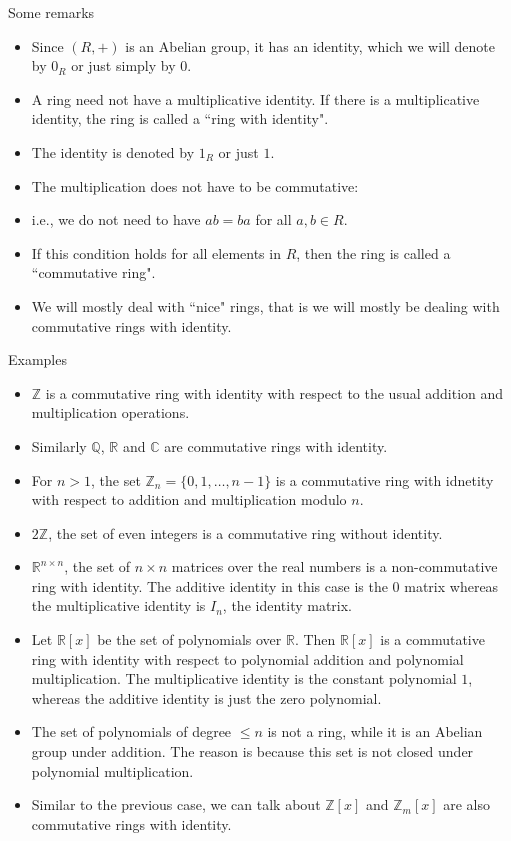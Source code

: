 \documentclass[ %
 10pt, xcolor={dvipsnames,svgnames,x11names,hyperref},
   hyperref={colorlinks=true,citecolor=green,linkcolor=DarkRed,urlcolor=ProcessBlue,anchorcolor=blue}
  ]{beamer}
\newenvironment{stepitemize}{\begin{itemize}[<+->]}{\end{itemize} }
\newcommand{\Z}{\mathbb{Z}}
\newcommand{\Q}{\mathbb{Q}}
\newcommand{\R}{\mathbb{R}}
\newcommand{\C}{\mathbb{C}}
\begin{document}
\begin{frame}{Some remarks}
    \begin{stepitemize}
    \item Since $(R,+)$ is an Abelian group, it has an identity, which we will denote by $0_R$ or just simply by $0$. 
    \item A ring need not have a multiplicative identity. If there is a multiplicative identity, the ring is called a ``ring with identity". 
    \item The identity is denoted by $1_R$ or just $1$.
    \item The multiplication does not have to be commutative: \item i.e., we do not need to have $ab=ba$ for all $a,b \in R$. 
    \item If this condition holds for all elements in $R$, then the ring is called a ``commutative ring".
    \item We will mostly deal with ``nice" rings, that is we will mostly be dealing with commutative rings with identity.
    \end{stepitemize}
\end{frame}

\begin{frame}{Examples}
\begin{stepitemize}
\item $\Z$ is a commutative ring with identity with respect to the usual addition and multiplication operations. 
    \item Similarly $\Q$, $\R$ and $\C$ are commutative rings with identity.
    \item For $n>1$, the set $\Z_n=\{0,1, \dots, n-1\}$ is a commutative ring with idnetity with respect to addition and multiplication modulo $n$. 
    \item $2\Z$, the set of even integers is a commutative ring without identity.
    \item $\R^{n\times n}$, the set of $n\times n$ matrices over the real numbers is a non-commutative ring with identity. The additive identity in this case is the $0$ matrix whereas the multiplicative identity is $I_n$, the identity matrix. 
    \item Let $\R[x]$ be the set of polynomials over $\R$. Then $\R[x]$ is a commutative ring with identity with respect to polynomial addition and polynomial multiplication. The multiplicative identity is the constant polynomial $1$, whereas the additive identity is just the zero polynomial.
    \item The set of polynomials of degree $\leq n$ is not a ring, while it is an Abelian group under addition. The reason is because this set is not closed under polynomial multiplication.  
    \item Similar to the previous case, we can talk about 
    $\Z[x]$ and $\Z_m[x]$ are also commutative rings with identity.
\end{stepitemize}
    
\end{frame}
\end{document}
